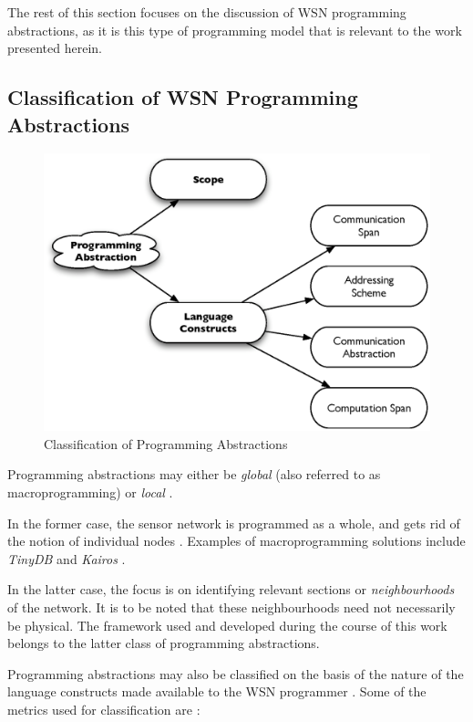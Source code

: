 The rest of this section focuses on the discussion of WSN programming
abstractions, as it is this type of programming model that is relevant to the
work presented herein.

\subsection{Classification of WSN Programming Abstractions}

\begin{figure}
\centering
\includegraphics[scale=0.65]{img/ProgAbstr_Classification.eps}
\caption{Classification of Programming Abstractions} 
\label{Fig:ProgrAbstrClassification}
\end{figure} 

Programming abstractions may either be \emph{global} (also referred to 
as macroprogramming) or \emph{local} \cite{hadim_middleware:2006}. 

In the former case, the sensor network is programmed as a whole, and gets rid of
the notion of individual nodes \cite{mottola_middleware:2008}. Examples of
macroprogramming solutions include \emph{TinyDB} \cite{madden_TinyDB:2005} and
\emph{Kairos} \cite{gummadi_Kairos:2005}. 

In the latter case, the focus is on identifying relevant sections or
\emph{neighbourhoods} of the network. It is to be noted that these neighbourhoods
need not necessarily be physical. The framework used and developed during the
course of this work belongs to the latter class of programming abstractions.

Programming abstractions may also be classified on the basis of the
nature of the language constructs made available to the WSN programmer
\cite{mottola_middleware:2008}. Some of the metrics used for classification
are \cite{mottola_middleware:2008}:

